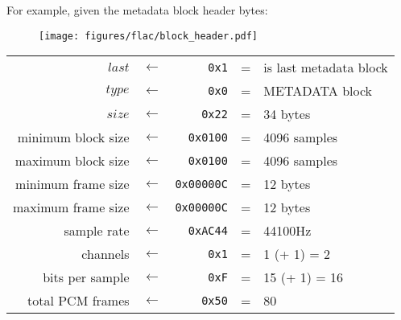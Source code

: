 \clearpage

For example, given the metadata block header bytes:
\begin{figure}[h]
\texttt{[image: figures/flac/block\_header.pdf]}
\end{figure}
\par
\noindent
\begin{tabular}{rcrcl}
$last$ & $\leftarrow$ & \texttt{0x1} & = & is last metadata block \\
$type$ & $\leftarrow$ & \texttt{0x0} & = & METADATA block \\
$size$ & $\leftarrow$ & \texttt{0x22} & = & 34 bytes \\
minimum block size & $\leftarrow$ & \texttt{0x0100} & = & 4096 samples \\
maximum block size & $\leftarrow$ & \texttt{0x0100} & = & 4096 samples \\
minimum frame size & $\leftarrow$ & \texttt{0x00000C} & = & 12 bytes \\
maximum frame size & $\leftarrow$ & \texttt{0x00000C} & = & 12 bytes \\
sample rate & $\leftarrow$ & \texttt{0xAC44} & = & 44100Hz \\
channels & $\leftarrow$ & \texttt{0x1} & = & 1 (+ 1) = 2 \\
bits per sample & $\leftarrow$ & \texttt{0xF} & = & 15 (+ 1) = 16 \\
total PCM frames & $\leftarrow$ & \texttt{0x50} & = & 80
\end{tabular}


